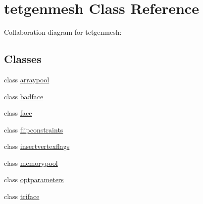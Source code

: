 \hypertarget{classtetgenmesh}{}\section{tetgenmesh Class Reference}
\label{classtetgenmesh}


Collaboration diagram for tetgenmesh\+:
\subsection*{Classes}
\begin{DoxyCompactItemize}
\item 
class \hyperlink{classtetgenmesh_1_1arraypool}{arraypool}
\item 
class \hyperlink{classtetgenmesh_1_1badface}{badface}
\item 
class \hyperlink{classtetgenmesh_1_1face}{face}
\item 
class \hyperlink{classtetgenmesh_1_1flipconstraints}{flipconstraints}
\item 
class \hyperlink{classtetgenmesh_1_1insertvertexflags}{insertvertexflags}
\item 
class \hyperlink{classtetgenmesh_1_1memorypool}{memorypool}
\item 
class \hyperlink{classtetgenmesh_1_1optparameters}{optparameters}
\item 
class \hyperlink{classtetgenmesh_1_1triface}{triface}
\end{DoxyCompactItemize}

